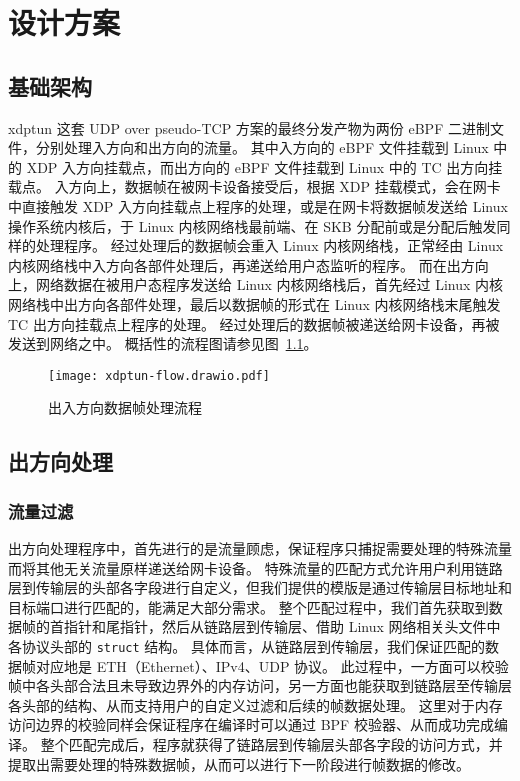 

\chapter{设计方案}

\section{基础架构}

xdptun 这套 UDP over pseudo-TCP 方案的最终分发产物为两份 eBPF 二进制文件，分别处理入方向和出方向的流量。
其中入方向的 eBPF 文件挂载到 Linux 中的 XDP 入方向挂载点，而出方向的 eBPF 文件挂载到 Linux 中的 TC 出方向挂载点。
入方向上，数据帧在被网卡设备接受后，根据 XDP 挂载模式，会在网卡中直接触发 XDP 入方向挂载点上程序的处理，或是在网卡将数据帧发送给 Linux 操作系统内核后，于 Linux 内核网络栈最前端、在 SKB 分配前或是分配后触发同样的处理程序。
经过处理后的数据帧会重入 Linux 内核网络栈，正常经由 Linux 内核网络栈中入方向各部件处理后，再递送给用户态监听的程序。
而在出方向上，网络数据在被用户态程序发送给 Linux 内核网络栈后，首先经过 Linux 内核网络栈中出方向各部件处理，最后以数据帧的形式在 Linux 内核网络栈末尾触发 TC 出方向挂载点上程序的处理。
经过处理后的数据帧被递送给网卡设备，再被发送到网络之中。
概括性的流程图请参见图~\ref{fig:flow}。

\begin{figure}[h]
  \centering
  \texttt{[image: xdptun-flow.drawio.pdf]}
  \caption{出入方向数据帧处理流程}
  \label{fig:flow}
\end{figure}

\section{出方向处理}

\subsection{流量过滤}

出方向处理程序中，首先进行的是流量顾虑，保证程序只捕捉需要处理的特殊流量而将其他无关流量原样递送给网卡设备。
特殊流量的匹配方式允许用户利用链路层到传输层的头部各字段进行自定义，但我们提供的模版是通过传输层目标地址和目标端口进行匹配的，能满足大部分需求。
整个匹配过程中，我们首先获取到数据帧的首指针和尾指针，然后从链路层到传输层、借助 Linux 网络相关头文件中各协议头部的 \texttt{struct} 结构。
具体而言，从链路层到传输层，我们保证匹配的数据帧对应地是 ETH（Ethernet）、IPv4、UDP 协议。
此过程中，一方面可以校验帧中各头部合法且未导致边界外的内存访问，另一方面也能获取到链路层至传输层各头部的结构、从而支持用户的自定义过滤和后续的帧数据处理。
这里对于内存访问边界的校验同样会保证程序在编译时可以通过 BPF 校验器、从而成功完成编译。
整个匹配完成后，程序就获得了链路层到传输层头部各字段的访问方式，并提取出需要处理的特殊数据帧，从而可以进行下一阶段进行帧数据的修改。

